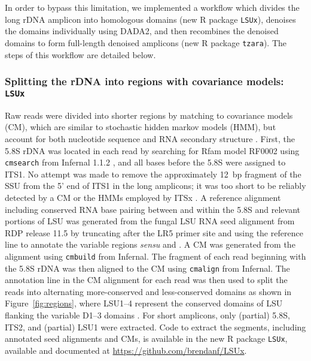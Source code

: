 \documentclass[
]{article}
\begin{document}
In order to bypass this limitation, we implemented a workflow which divides the long rDNA amplicon into homologous domains (new R package \texttt{LSUx}), denoises the domains individually using DADA2, and then recombines the denoised domains to form full-length denoised amplicons (new R package \texttt{tzara}).
The steps of this workflow are detailed below.

\hypertarget{splitting-the-rdna-into-regions-with-covariance-models-lsux}{%
\subsubsection{\texorpdfstring{Splitting the rDNA into regions with covariance models: \texttt{LSUx}}{Splitting the rDNA into regions with covariance models: LSUx}}\label{splitting-the-rdna-into-regions-with-covariance-models-lsux}}

Raw reads were divided into shorter regions by matching to covariance models (CM), which are similar to stochastic hidden markov models (HMM), but account for both nucleotide sequence and RNA secondary structure \autocite{eddy1994}.
First, the 5.8S rDNA was located in each read by searching for Rfam model RF0002 \autocite{kalvari2018} using \texttt{cmsearch} from Infernal 1.1.2 \autocite{nawrocki2013}, and all bases before the 5.8S were assigned to ITS1.
No attempt was made to remove the approximately 12~bp fragment of the SSU from the 5' end of ITS1 in the long amplicons; it was too short to be reliably detected by a CM or the HMMs employed by ITSx \autocite{bengtsson-palme2013}.
A reference alignment including conserved RNA base pairing between and within the 5.8S and relevant portions of LSU was generated from the fungal LSU RNA seed alignment from RDP release 11.5 \autocite{glockner2017,cole2014} by truncating after the LR5 primer site and using the reference line to annotate the variable regions \emph{sensu} \textcite{michot1984} and \textcite{raue1988}.
A CM was generated from the alignment using \texttt{cmbuild} from Infernal.
The fragment of each read beginning with the 5.8S rDNA was then aligned to the CM using \texttt{cmalign} from Infernal.
The annotation line in the CM alignment for each read was then used to split the reads into alternating more-conserved and less-conserved domains as shown in Figure~\ref{fig:regions},
where LSU1--4 represent the conserved domains of LSU flanking the variable D1--3 domains \autocite{michot1984}.
For short amplicons, only (partial) 5.8S, ITS2, and (partial) LSU1 were extracted.
Code to extract the segments, including annotated seed alignments and CMs, is available in the new R package \texttt{LSUx}, available and documented at \url{https://github.com/brendanf/LSUx}.
\end{document}
